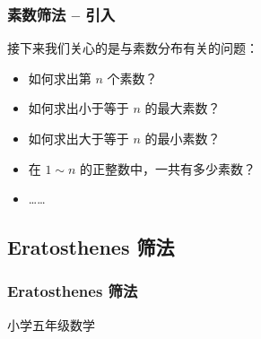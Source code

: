 \documentclass{../pkslide}
\begin{document}

\begin{frame}
  \frametitle{素数筛法 -- 引入}
  
  接下来我们关心的是与素数分布有关的问题：
  
  \begin{itemize}
    \item 如何求出第 $n$ 个素数？
    \item 如何求出小于等于 $n$ 的最大素数？
    \item 如何求出大于等于 $n$ 的最小素数？
    \item 在 $1 \sim n$ 的正整数中，一共有多少素数？
    \item ……
  \end{itemize}
  
\end{frame}


\subsection{Eratosthenes 筛法}
\subsubsection*{Eratosthenes 筛法}


\begin{frame}{小学五年级数学}
  
\end{frame}
\end{document}
